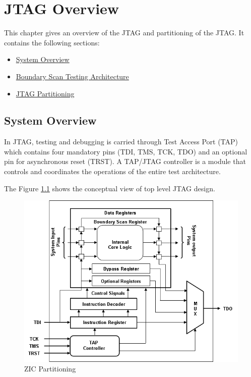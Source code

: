 \chapter{JTAG Overview}
This chapter gives an overview of the JTAG  and partitioning of the JTAG. It contains the following sections:
\begin{itemize}
    \item \hyperref[sec:system-overview]{System Overview}
    \item \hyperref[sec:bst-arhitecture]{Boundary Scan Testing Architecture}
    \item \hyperref[sec:jtag-partitioning]{JTAG Partitioning}
\end{itemize}
\newpage

\section{System Overview}
\label{sec:system-overview}
In JTAG, testing and debugging is carried through Test Access Port (TAP) which contains four mandatory pins (TDI, TMS, TCK, TDO) and an optional pin for asynchronous reset (TRST). A  TAP/JTAG controller is a module that controls and coordinates the operations of the entire test architecture.

The Figure \ref{fig:zic_partitioning} shows the conceptual view of top level JTAG design.

\vspace{1cm}
\begin{figure}[H]
    \centering
    \includegraphics[width = 15cm]{images/jtag_block_diagram.png}
    \vspace{1cm}
    \caption{ZIC Partitioning}
    \label{fig:zic_partitioning}
\end{figure}
\vspace{1cm}

